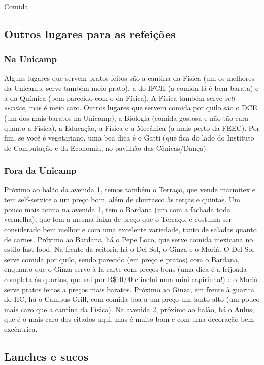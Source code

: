 \begin{story}{Comida}
\subsection*{Outros lugares para as refeições}

\subsubsection*{Na Unicamp}

Alguns lugares que servem pratos feitos são a cantina da Física (um os melhores da Unicamp, serve também meio-prato), a do IFCH (a comida lá é bem barata) e a da Química (bem parecido com o da Física). A Física também serve \emph{self-service}, mas é meio caro. Outros lugares que servem comida por quilo são o DCE (um dos mais baratos na Unicamp), a Biologia (comida gostosa e não tão cara quanto a Física), a Educação, a Física e a Mecânica (a mais perto da FEEC). Por fim, se você é vegetariano, uma boa dica é o Gatti (que fica do lado do Instituto de Computação e da Economia, no pavilhão das Cênicas/Dança).

\subsubsection*{Fora da Unicamp}

Próximo ao balão da avenida 1, temos também o Terraço, que vende marmitex e tem self-service a um preço bom, além de churrasco às terças e quintas. Um pouco mais acima na avenida 1, tem o Bardana (um com a fachada toda vermelha), que tem a mesma faixa de preço que o Terraço, e costuma ser considerado bem melhor e com uma excelente variedade, tanto de saladas quanto de carnes. Próximo ao Bardana, há o Pepe Loco, que serve comida mexicana no estilo fast-food. Na frente da reitoria há o Del Sol, o Ginza e o Moriá. O Del Sol serve comida por quilo, sendo parecido (em preço e pratos) com o Bardana, enquanto que o Ginza serve à la carte com preços bons (uma dica é a feijoada completa às quartas, que sai por R\$10,00 e inclui uma mini-capirinha!) e o Moriá serve pratos feitos a preços mais baratos. Próximo ao Ginza, em frente à guarita do HC, há o Campus Grill, com comida boa a um preço um tanto alto (um pouco mais caro que a cantina da Física). Na avenida 2, próximo ao balão, há o Aulus, que é o mais caro dos citados aqui, mas é muito bom e com uma decoração bem excêntrica.

\subsection*{Lanches e sucos}


\end{story}

